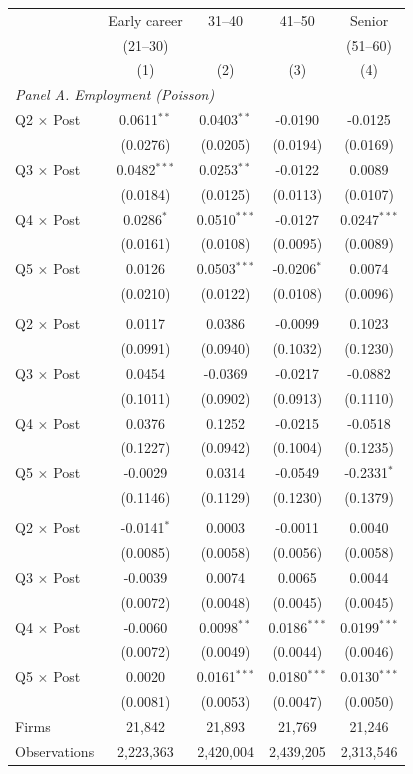 \begin{tabular}{lcccc}
\toprule
 & Early career & 31--40 & 41--50 & Senior \\
 & (21--30) &  &  & (51--60) \\
 & (1) & (2) & (3) & (4) \\
\midrule
\multicolumn{5}{l}{\textit{Panel A. Employment (Poisson)}} \\
Q2 $\times$ Post & 0.0611$^{**}$ & 0.0403$^{**}$ & -0.0190 & -0.0125 \\
 & (0.0276) & (0.0205) & (0.0194) & (0.0169) \\
Q3 $\times$ Post & 0.0482$^{***}$ & 0.0253$^{**}$ & -0.0122 & 0.0089 \\
 & (0.0184) & (0.0125) & (0.0113) & (0.0107) \\
Q4 $\times$ Post & 0.0286$^{*}$ & 0.0510$^{***}$ & -0.0127 & 0.0247$^{***}$ \\
 & (0.0161) & (0.0108) & (0.0095) & (0.0089) \\
Q5 $\times$ Post & 0.0126 & 0.0503$^{***}$ & -0.0206$^{*}$ & 0.0074 \\
 & (0.0210) & (0.0122) & (0.0108) & (0.0096) \\
\addlinespace
\multicolumn{5}{l}{\textit{Panel B. New hires (Poisson)}} \\
Q2 $\times$ Post & 0.0117 & 0.0386 & -0.0099 & 0.1023 \\
 & (0.0991) & (0.0940) & (0.1032) & (0.1230) \\
Q3 $\times$ Post & 0.0454 & -0.0369 & -0.0217 & -0.0882 \\
 & (0.1011) & (0.0902) & (0.0913) & (0.1110) \\
Q4 $\times$ Post & 0.0376 & 0.1252 & -0.0215 & -0.0518 \\
 & (0.1227) & (0.0942) & (0.1004) & (0.1235) \\
Q5 $\times$ Post & -0.0029 & 0.0314 & -0.0549 & -0.2331$^{*}$ \\
 & (0.1146) & (0.1129) & (0.1230) & (0.1379) \\
\addlinespace
\multicolumn{5}{l}{\textit{Panel C. Log monthly earnings (OLS)}} \\
Q2 $\times$ Post & -0.0141$^{*}$ & 0.0003 & -0.0011 & 0.0040 \\
 & (0.0085) & (0.0058) & (0.0056) & (0.0058) \\
Q3 $\times$ Post & -0.0039 & 0.0074 & 0.0065 & 0.0044 \\
 & (0.0072) & (0.0048) & (0.0045) & (0.0045) \\
Q4 $\times$ Post & -0.0060 & 0.0098$^{**}$ & 0.0186$^{***}$ & 0.0199$^{***}$ \\
 & (0.0072) & (0.0049) & (0.0044) & (0.0046) \\
Q5 $\times$ Post & 0.0020 & 0.0161$^{***}$ & 0.0180$^{***}$ & 0.0130$^{***}$ \\
 & (0.0081) & (0.0053) & (0.0047) & (0.0050) \\
\midrule
Firms & 21,842 & 21,893 & 21,769 & 21,246 \\
Observations & 2,223,363 & 2,420,004 & 2,439,205 & 2,313,546 \\
\bottomrule
\end{tabular}
